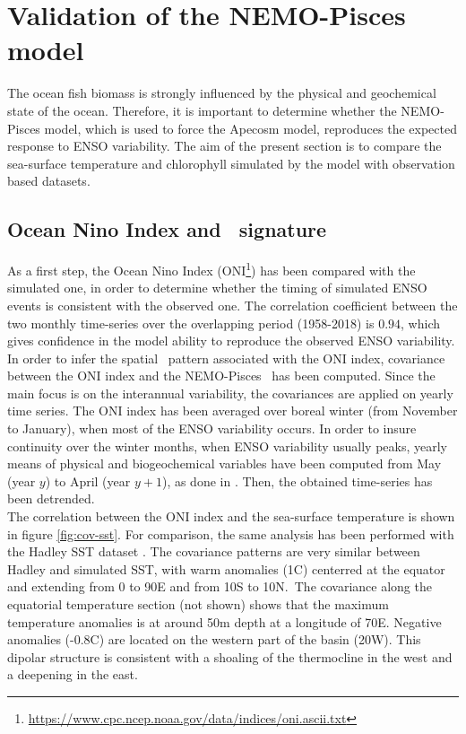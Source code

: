 \section{Validation of the NEMO-Pisces model}
\label{sec:pisces}

The ocean fish biomass is strongly influenced by the physical and geochemical state of the ocean. Therefore, it is important to determine whether the NEMO-Pisces model, which is used to force the Apecosm model, reproduces the expected response to ENSO variability. The aim of the present section is to compare the sea-surface temperature and chlorophyll simulated by the model with observation based datasets.

\subsection{Ocean Nino Index and \sst\ signature}
\label{sec:sst}

As a first step, the Ocean Nino Index (ONI\footnote{\url{https://www.cpc.ncep.noaa.gov/data/indices/oni.ascii.txt}}) has been compared with the simulated one, in order to determine whether the timing of simulated ENSO events is consistent with the observed one. The correlation coefficient between the two monthly time-series over the overlapping period (1958-2018) is $0.94$, which gives confidence in the model ability to reproduce the observed ENSO variability. \\

In order to infer the spatial \sst\ pattern associated with the ONI index, covariance between the ONI index and the NEMO-Pisces \sst\ has been computed. Since the main focus is on the interannual variability, the covariances are applied on yearly time series. The ONI index has been averaged over boreal winter (from November to January), when most of the ENSO variability occurs. In order to insure continuity over the winter months, when ENSO variability usually peaks, yearly means of physical and biogeochemical variables have been computed from May (year $y$) to April (year $y + 1$), as done in \cite{racaultImpactNinoVariability2017}. Then, the obtained time-series has been detrended.\\

The correlation between the ONI index and the sea-surface temperature is shown in figure \ref{fig:cov-sst}. For comparison, the same analysis has been performed with the Hadley SST dataset \citep{raynerGlobalAnalysesSea2003}.
The covariance patterns are very similar between Hadley and simulated SST, with warm anomalies (1\degree C) centerred at the equator and extending from 0 to 90\degree E and from 10\degree S to 10N.\ 
The covariance along the equatorial temperature section (not shown) shows that the maximum temperature anomalies is at around 50m depth at a longitude of 70\degree E. Negative anomalies (-0.8\degree C) are located on the western part of the basin (20\degree W). This dipolar structure is consistent with a shoaling of the thermocline in the west and a deepening in the east.\\

